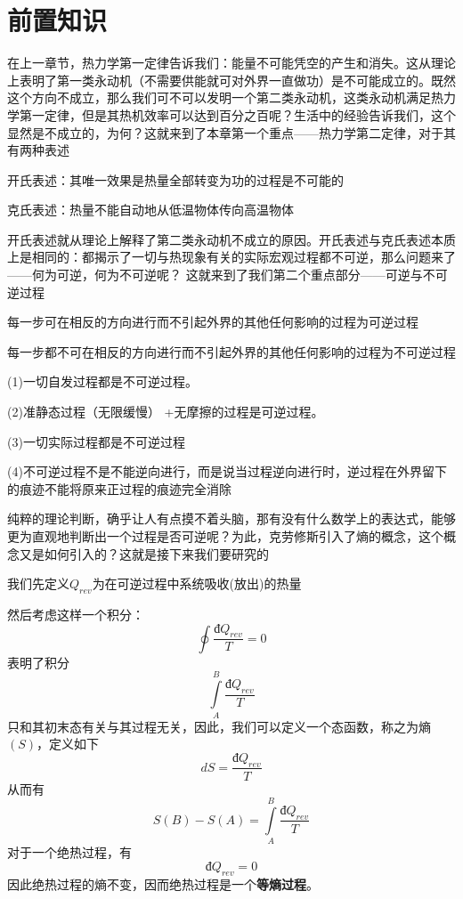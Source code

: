 \documentclass[lang=cn,10pt]{elegantbook}
\begin{document}
	\section{前置知识}
	在上一章节，热力学第一定律告诉我们：能量不可能凭空的产生和消失。这从理论上表明了第一类永动机（不需要供能就可对外界一直做功）是不可能成立的。既然这个方向不成立，那么我们可不可以发明一个第二类永动机，这类永动机满足热力学第一定律，但是其热机效率可以达到百分之百呢？生活中的经验告诉我们，这个显然是不成立的，为何？这就来到了本章第一个重点——热力学第二定律，对于其有两种表述
	\begin{theorem}[热力学第二定律]
		开氏表述：其唯一效果是热量全部转变为功的过程是不可能的
		
		克氏表述：热量不能自动地从低温物体传向高温物体
	\end{theorem}
	开氏表述就从理论上解释了第二类永动机不成立的原因。开氏表述与克氏表述本质上是相同的：都揭示了一切与热现象有关的实际宏观过程都不可逆，那么问题来了——何为可逆，何为不可逆呢？
	这就来到了我们第二个重点部分——可逆与不可逆过程
	\begin{definition}[可逆过程]
		每一步可在相反的方向进行而不引起外界的其他任何影响的过程为可逆过程
	\end{definition}
	\begin{definition}[不可逆过程]
		每一步都不可在相反的方向进行而不引起外界的其他任何影响的过程为不可逆过程
	\end{definition}
	\begin{note}
		(1)一切自发过程都是不可逆过程。
		
		(2)准静态过程（无限缓慢） +无摩擦的过程是可逆过程。
		
		(3)一切实际过程都是不可逆过程
		
		(4)不可逆过程不是不能逆向进行，而是说当过程逆向进行时，逆过程在外界留下的痕迹不能将原来正过程的痕迹完全消除
	\end{note}
	纯粹的理论判断，确乎让人有点摸不着头脑，那有没有什么数学上的表达式，能够更为直观地判断出一个过程是否可逆呢？为此，克劳修斯引入了熵的概念，这个概念又是如何引入的？这就是接下来我们要研究的
	
	我们先定义$Q_{rev}$为在可逆过程中系统吸收(放出)的热量
	
	然后考虑这样一个积分：
	\begin{equation*}
		\oint{\frac{\text{đ}Q_{rev}}{T}}=0
	\end{equation*}
	表明了积分
	\begin{equation*}
		\int\limits_A^B{\frac{\text{đ}Q_{rev}}{T}}
	\end{equation*}
	只和其初末态有关与其过程无关，因此，我们可以定义一个态函数，称之为熵$(S)$，定义如下
	\begin{equation*}
		dS=\frac{\text{đ}Q_{rev}}{T}
	\end{equation*}
	从而有
	\begin{equation*}
		S(B)-S(A)=\int\limits_A^B{\frac{\text{đ}Q_{rev}}{T}}
	\end{equation*}
	对于一个绝热过程，有
	\begin{equation*}
		\text{đ}Q_{rev}=0
	\end{equation*}
	因此绝热过程的熵不变，因而绝热过程是一个\textbf{等熵过程}。
	
\end{document}
